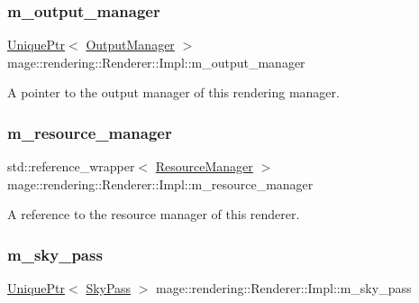 \subsubsection{\texorpdfstring{m\+\_\+output\+\_\+manager}{m\_output\_manager}}
{\footnotesize\ttfamily \hyperlink{namespacemage_a3316d7143a973e37adf1110f2e80ca31}{Unique\+Ptr}$<$ \hyperlink{classmage_1_1rendering_1_1_output_manager}{Output\+Manager} $>$ mage\+::rendering\+::\+Renderer\+::\+Impl\+::m\+\_\+output\+\_\+manager\hspace{0.3cm}{\ttfamily [private]}}

A pointer to the output manager of this rendering manager. \hypertarget{classmage_1_1rendering_1_1_renderer_1_1_impl_a4e128f17ff567e4af890c730c6357c94}{}\label{classmage_1_1rendering_1_1_renderer_1_1_impl_a4e128f17ff567e4af890c730c6357c94} 
\subsubsection{\texorpdfstring{m\+\_\+resource\+\_\+manager}{m\_resource\_manager}}
{\footnotesize\ttfamily std\+::reference\+\_\+wrapper$<$ \hyperlink{classmage_1_1rendering_1_1_resource_manager}{Resource\+Manager} $>$ mage\+::rendering\+::\+Renderer\+::\+Impl\+::m\+\_\+resource\+\_\+manager\hspace{0.3cm}{\ttfamily [private]}}

A reference to the resource manager of this renderer. \hypertarget{classmage_1_1rendering_1_1_renderer_1_1_impl_afc248fa0b293e9cbd2d0045c4caa7d26}{}\label{classmage_1_1rendering_1_1_renderer_1_1_impl_afc248fa0b293e9cbd2d0045c4caa7d26} 
\subsubsection{\texorpdfstring{m\+\_\+sky\+\_\+pass}{m\_sky\_pass}}
{\footnotesize\ttfamily \hyperlink{namespacemage_a3316d7143a973e37adf1110f2e80ca31}{Unique\+Ptr}$<$ \hyperlink{classmage_1_1rendering_1_1_sky_pass}{Sky\+Pass} $>$ mage\+::rendering\+::\+Renderer\+::\+Impl\+::m\+\_\+sky\+\_\+pass\hspace{0.3cm}{\ttfamily [private]}}

